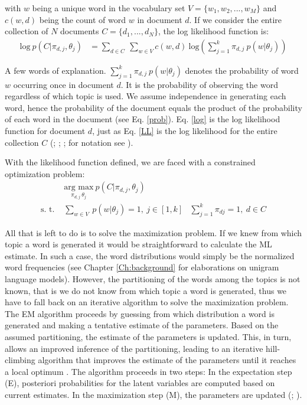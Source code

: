 \documentclass[11pt,a4paper,english,oneside]{book}
\numberwithin{equation}{chapter}
\begin{document}
\noindent with $w$ being a unique word in the vocabulary set $V = \{w_1, w_2, ..., w_M\}$ and $c(w,d)$ being the count of word $w$ in document $d$. If we consider the entire collection of $N$ documents $C=\{d_1,...,d_N\}$, the log likelihood function is:
\begin{align}
\label{LL} \text{log} \ p(C|\pi_{d,j},\theta_j) &= \underset{d \in C}{\sum} \ \underset{w \in V}\sum c(w,d) \ \text{log} \left( \sum_{j=1}^{k}\pi_{d,j} \ p(w|\theta_j) \right)
\end{align}


A few words of explanation. $\sum_{j=1}^{k}\pi_{d,j} \ p(w|\theta_j)$ denotes the probability of word $w$ occurring once in document $d$. It is the probability of observing the word regardless of which topic is used. We assume independence in generating each word, hence the probability of the document equals the product of the probability of each word in the document (see Eq. \ref{prob}). Eq. \ref{log} is the log likelihood function for document $d$, just as Eq. \ref{LL} is the log likelihood for the entire collection $C$ (\citealp{Hofmann.1999}; \citeyear{Hofmann.2001}; \citealp{Steyvers(2007)}; for notation see \citealp[~p. 340--377]{Zhai.2016}).

With the likelihood function defined, we are faced with a constrained optimization problem:
\begin{align}\label{argmax}
 & \underset{\pi_{d,j} \ \theta_j}{\text{arg max}} \ p(C|\pi_{d,j},\theta_j) &\\
\label{constraints} \text{s. t. } & \underset{w \in V}{\sum} \ p(w | \theta_j) = 1, \  j \in [1,k] &  \sum_{j=1}^{k} \pi_{dj} = 1, \ d \in C
\end{align}

All that is left to do is to solve the maximization problem. If we knew from which topic a word is generated it would be straightforward to calculate the ML estimate. In such a case, the word distributions would simply be the normalized word frequencies (see Chapter \ref{Ch:background} for elaborations on unigram language models). However, the partitioning of the words among the topics is not known, that is we do not know from which topic a word is generated, thus we have to fall back on an iterative algorithm to solve the maximization problem. The EM algorithm proceeds by guessing from which distribution a word is generated and making a tentative estimate of the parameters. Based on the assumed partitioning, the estimate of the parameters is updated. This, in turn, allows an improved inference of the partitioning, leading to an iterative hill-climbing algorithm that improves the estimate of the parameters until it reaches a local optimum \cite[p. 360]{Zhai.2016}. The algorithm proceeds in two steps: In the expectation step (E), posteriori probabilities for the latent variables are computed based on current estimates. In the maximization step (M), the parameters are updated (\citealp[p. 290]{Hofmann.1999}; \citeyear[p. 181--182]{Hofmann.1999}). 
\end{document}
